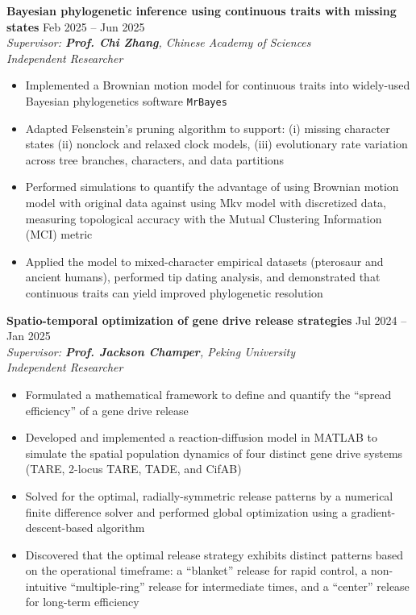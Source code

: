 \documentclass[a4paper,10pt]{extarticle}
\begin{document}
\noindent
\textbf{Bayesian phylogenetic inference using continuous traits with missing states} \hfill Feb 2025 -- Jun 2025 \\
\textit{Supervisor: \textbf{Prof. Chi Zhang}, Chinese Academy of Sciences} \\
\textit{Independent Researcher}
\begin{itemize}
\item Implemented a Brownian motion model for continuous traits into widely-used Bayesian phylogenetics software \texttt{MrBayes}
\item Adapted Felsenstein's pruning algorithm to support: (i) missing character states (ii) nonclock and relaxed clock models, (iii) evolutionary rate variation across tree branches, characters, and data partitions
\item Performed simulations to quantify the advantage of using Brownian motion model with original data against using Mkv model with discretized data, measuring topological accuracy with the Mutual Clustering Information (MCI) metric
\item Applied the model to mixed-character empirical datasets (pterosaur and ancient humans), performed tip dating analysis, and demonstrated that continuous traits can yield improved phylogenetic resolution
\end{itemize}



\noindent
\textbf{Spatio-temporal optimization of gene drive release strategies} \hfill Jul 2024 -- Jan 2025 \\
\textit{Supervisor: \textbf{Prof. Jackson Champer}, Peking University} \\
\textit{Independent Researcher}
\begin{itemize}
    \item Formulated a mathematical framework to define and quantify the ``spread efficiency'' of a gene drive release
    \item Developed and implemented a reaction-diffusion model in MATLAB to simulate the spatial population dynamics of four distinct gene drive systems (TARE, 2-locus TARE, TADE, and CifAB)
    \item Solved for the optimal, radially-symmetric release patterns by a numerical finite difference solver and performed global optimization using a gradient-descent-based algorithm
    \item Discovered that the optimal release strategy exhibits distinct patterns based on the operational timeframe: a ``blanket'' release for rapid control, a non-intuitive ``multiple-ring'' release for intermediate times, and a ``center'' release for long-term efficiency
\end{itemize}
\end{document}
